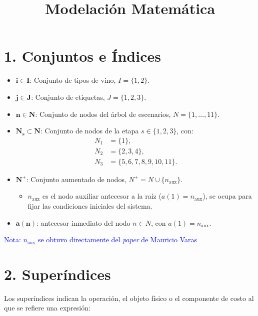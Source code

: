 \documentclass[11pt, letterpaper]{article}
\title{Modelación Matemática}
\begin{document}
\maketitle


\section*{1. Conjuntos e Índices}
\begin{itemize}
    \item $\bm{i \in I}$: Conjunto de tipos de vino, $I = \{1, 2\}$.
    
    \item $\bm{j \in J}$: Conjunto de etiquetas, $J = \{1, 2, 3\}$.
    
    \item $\bm{n \in N}$: Conjunto de nodos del árbol de escenarios,
    $N = \{1, \ldots, 11\}$.
    
    \item $\bm{N_s \subset N}$: Conjunto de nodos de la etapa $s \in \{1, 2, 3\}$, con:
    \begin{align*}
        N_1 &= \{1\}, \\
        N_2 &= \{2, 3, 4\}, \\
        N_3 &= \{5, 6, 7, 8, 9, 10, 11\}.
    \end{align*}
    
    \item $\bm{N^+}$: Conjunto aumentado de nodos, $N^+ = N \cup \{n_{\mathrm{aux}}\}$.
    \begin{itemize}
        \item $n_{\mathrm{aux}}$ es el nodo auxiliar antecesor a la raíz ($a(1) = n_{\mathrm{aux}}$), se ocupa para fijar las condiciones iniciales del sistema.
    \end{itemize}
    
    \item $\bm{a(n)}$: antecesor inmediato del nodo $n\in N$,
    con $a(1)=n_{\mathrm{aux}}$.
\end{itemize}

\textcolor{blue}{Nota: $n_{\mathrm{aux}}$ se obtuvo directamente del \textit{paper} de Mauricio Varas}


\section*{2. Superíndices}
Los superíndices indican la operación, el objeto físico o el componente de costo al que se refiere una expresión:
\end{document}
